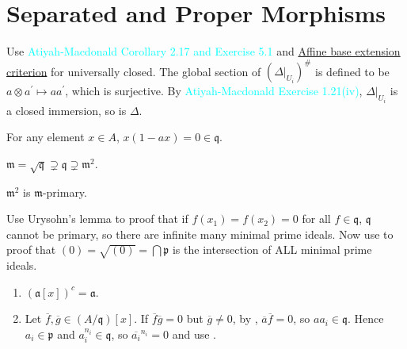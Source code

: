 \section{Separated and Proper Morphisms}

\begin{exercise}\label{ex4.1}
	Use \textcolor{cyan}{Atiyah-Macdonald Corollary 2.17 and Exercise 5.1} and \hyperref[affinebaseext]{Affine base extension criterion} for universally closed. The global section of $\left(\Delta|_{U_i}\right)^\#$ is defined to be $a\otimes a^\prime\mapsto aa^\prime$, which is surjective. By \textcolor{cyan}{Atiyah-Macdonald Exercise 1.21(iv)}, $\Delta|_{U_i}$ is a closed immersion, so is $\Delta$.
\end{exercise}

\begin{exercise}\label{ex4.2}
	
\end{exercise}

\begin{exercise}\label{ex4.3}
	For any element $x\in A$, $x(1-ax)=0\in\mathfrak{q}$.
\end{exercise}

\begin{exercise}\label{ex4.4}
	$\mathfrak{m}=\sqrt{\mathfrak{q}}\supsetneq\mathfrak{q}\supsetneq\mathfrak{m}^2$.
\end{exercise}

\begin{exercise}\label{ex4.5}
	$\mathfrak{m}^2$ is $\mathfrak{m}$-primary.
\end{exercise}

\begin{exercise}\label{ex4.6}
	Use Urysohn's lemma to proof that if $f\left(x_1\right)=f\left(x_2\right)=0$ for all $f\in\mathfrak{q}$, $\mathfrak{q}$ cannot be primary, so there are infinite many minimal prime ideals. Now use  to proof that $(0)=\sqrt{(0)}=\bigcap\mathfrak{p}$ is the intersection of ALL minimal prime ideals.
\end{exercise}

\begin{exercise}\label{ex4.7}
	\begin{enumerate}
		\item[(ii),(iv),(v)] $(\mathfrak{a}[x])^c=\mathfrak{a}$.
		\item[(iii)] Let $\overline{f},\overline{g}\in\left(A/\mathfrak{q}\right)[x]$. If $\overline{f}\overline{g}=0$ but $\overline{g}\neq0$, by , $\overline{a}\overline{f}=0$, so $aa_i\in\mathfrak{q}$. Hence $a_i\in\mathfrak{p}$ and $a_i^{n_i}\in\mathfrak{q}$, so $\overline{a_i}^{n_i}=0$ and use .
	\end{enumerate}
\end{exercise}

